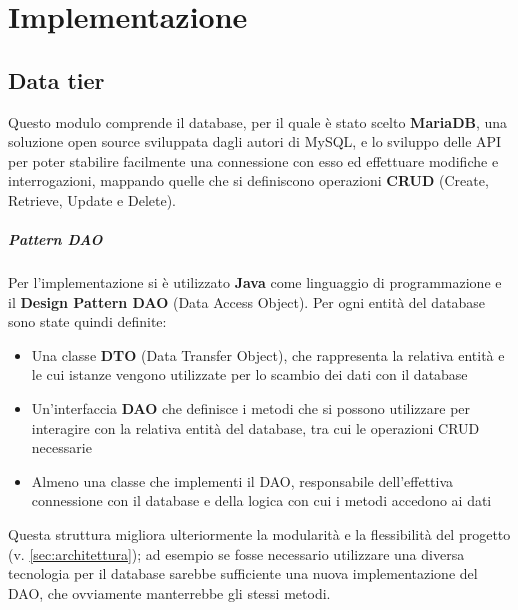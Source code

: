 
\chapter{Implementazione}


\section{Data tier}
Questo modulo comprende il database, per il quale è stato scelto \textbf{MariaDB},
una soluzione open source sviluppata dagli autori di MySQL, e lo sviluppo delle
API per poter stabilire facilmente una connessione con esso ed effettuare
modifiche e interrogazioni, mappando quelle che si definiscono operazioni
\textbf{CRUD} (Create, Retrieve, Update e Delete).

\paragraph{Pattern DAO}
Per l'implementazione si è utilizzato \textbf{Java} come linguaggio di programmazione
e il \textbf{Design Pattern DAO} (Data Access Object). Per ogni entità del database
sono state quindi definite:
\begin{itemize}
	\item Una classe \textbf{DTO} (Data Transfer Object), che rappresenta la
	relativa entità e le cui istanze vengono utilizzate per lo scambio dei dati
	con il database
	\item Un'interfaccia \textbf{DAO} che definisce i metodi che si possono
	utilizzare per interagire con la relativa entità del database, tra cui le
	operazioni CRUD necessarie
	\item Almeno una classe che implementi il DAO, responsabile dell'effettiva
	connessione con il database e della logica con cui i metodi accedono ai dati
\end{itemize}



Questa struttura migliora ulteriormente la modularità e la flessibilità del
progetto (v. \autoref{sec:architettura}); ad esempio se fosse necessario utilizzare
una diversa tecnologia per il database sarebbe sufficiente una nuova
implementazione del DAO, che ovviamente manterrebbe gli stessi metodi.


